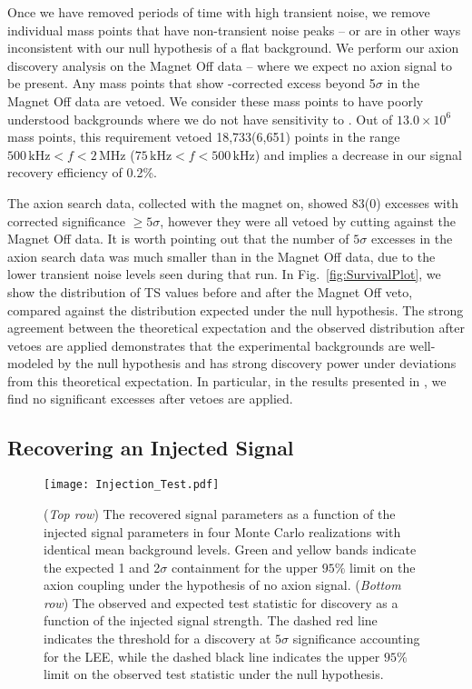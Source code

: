 \documentclass[aps,prd,amsmath,amssymb,reprint,superscriptaddress, nofootinbib,
]{revtex4-1}
\begin{document}
Once we have removed periods of time with high transient noise, we remove individual mass points that have non-transient noise peaks -- or are in other ways inconsistent with our null hypothesis of a flat background. We perform our axion discovery analysis on the Magnet Off data -- where we expect no axion signal to be present. Any mass points that show \LEE-corrected excess beyond 5$\sigma$ in the Magnet Off data are vetoed. We consider these mass points to have poorly understood backgrounds where we do not have sensitivity to \ADM. Out of $13.0\times10^6$ mass points, this requirement vetoed 18,733(6,651) points in the range $500\,\mathrm{kHz} < f < 2\,\mathrm{MHz}$ ($75\,\mathrm{kHz} < f < 500\,\mathrm{kHz}$) and implies a decrease in our signal recovery efficiency of 0.2\%.  

The axion search data, collected with the magnet on, showed 83(0) excesses with \LEE corrected significance $\geq5\sigma$, however they were all vetoed by cutting against the Magnet Off data. It is worth pointing out that the number of $5\sigma$ excesses in the axion search data was much smaller than in the Magnet Off data, due to the lower transient noise levels seen during that run. In Fig.~\ref{fig:SurvivalPlot}, we show the distribution of TS values before and after the Magnet Off veto, compared against the distribution expected under the null hypothesis. The strong agreement between the theoretical expectation and the observed distribution after vetoes are applied demonstrates that the experimental backgrounds are well-modeled by the null hypothesis and \abra has strong discovery power under deviations from this theoretical expectation. In particular, in the results presented in \cite{ABRAFirstResults}, we find no significant excesses after vetoes are applied. 

\subsection{Recovering an Injected Signal}
\label{sec:InjectedSignal}

\begin{figure*}
\centering
\texttt{[image: Injection\_Test.pdf]}
\caption{(\textit{Top row}) The recovered signal parameters as a function of the injected signal parameters in four Monte Carlo realizations with identical mean background levels. Green and yellow bands indicate the expected 1 and 2$\sigma$ containment for the upper $95\%$ limit on the axion coupling under the hypothesis of no axion signal. (\textit{Bottom row}) The observed and expected test statistic for discovery as a function of the injected signal strength. The dashed red line indicates the threshold for a discovery at $5\sigma$ significance accounting for the LEE, while the dashed black line indicates the upper $95\%$ limit on the observed test statistic under the null hypothesis.}
\label{fig:InjectionTest}
\end{figure*}
\end{document}
